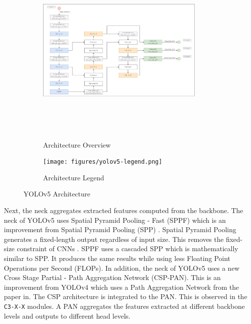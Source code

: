 \documentclass[12pt,a4paper,fleqn]{report}
\begin{document}
\begin{figure}[htbp]
    \centering
    \begin{subfigure}[htbp]{\textwidth}
        \begin{center}
            \includegraphics[width=0.9\textwidth,height=9.5cm]{figures/yolov5-arch.png}
        \end{center}
        \caption{Architecture Overview}
        \label{fig:yolov5-architecture-overview}
    \end{subfigure}
    \centering
    \begin{subfigure}[htbp]{\textwidth}
        \begin{center}
            \texttt{[image: figures/yolov5-legend.png]}
        \end{center}
        \caption{Architecture Legend}
        \label{fig:yolov5-architecture-legend}
    \end{subfigure}
    \caption{YOLOv5 Architecture}
    \label{fig:yolov5-architecture}
\end{figure}

Next, the neck aggregates extracted features computed from the backbone. 
The neck of YOLOv5 uses Spatial Pyramid Pooling - Fast (SPPF) which is an improvement from Spatial Pyramid
Pooling (SPP) \cite{spp:2014}. 
Spatial Pyramid Pooling generates a fixed-length output regardless of input size. 
This removes the fixed-size constraint of CNNs \cite{spp:2014}.
SPPF uses a cascaded SPP which is mathematically similar to SPP. 
It produces the same results while using less Floating Point Operations per Second (FLOPs). 
In addition, the neck of YOLOv5 uses a new Cross Stage Partial - Path Aggregation Network (CSP-PAN). 
This is an improvement from YOLOv4 which uses a Path Aggregation Network from the paper
in\cite{pan:2018}. 
The CSP architecture is integrated to the PAN.
This is observed in the \texttt{C3-X-X} modules.
A PAN aggregates the features extracted at different backbone levels and outputs to different
head levels. 
\end{document}
